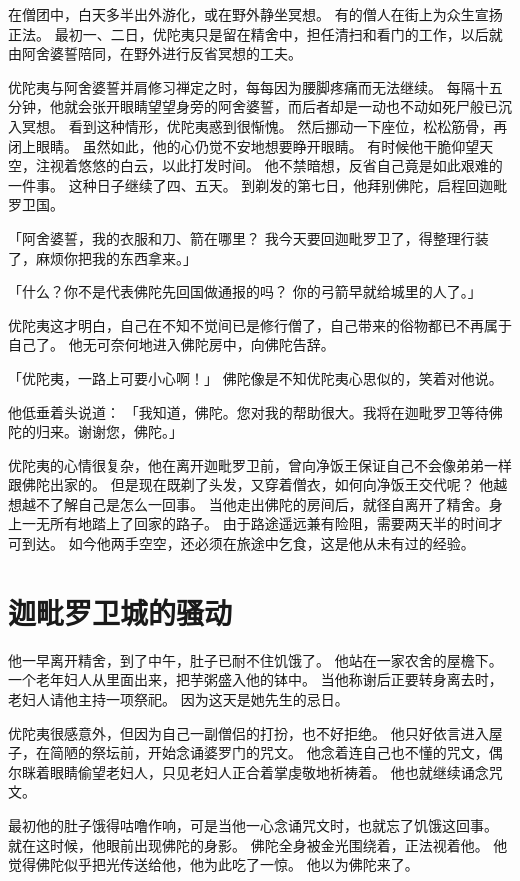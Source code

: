 \documentclass[twoside,openany]{book}
\begin{document}
在僧团中，白天多半出外游化，或在野外静坐冥想。
有的僧人在街上为众生宣扬正法。
最初一、二日，优陀夷只是留在精舍中，担任清扫和看门的工作，以后就由阿舍婆誓陪同，在野外进行反省冥想的工夫。

优陀夷与阿舍婆誓并肩修习禅定之时，每每因为腰脚疼痛而无法继续。
每隔十五分钟，他就会张开眼睛望望身旁的阿舍婆誓，而后者却是一动也不动如死尸般已沉入冥想。
看到这种情形，优陀夷惑到很惭愧。
然后挪动一下座位，松松筋骨，再闭上眼睛。
虽然如此，他的心仍觉不安地想要睁开眼睛。
有时候他干脆仰望天空，注视着悠悠的白云，以此打发时间。
他不禁暗想，反省自己竟是如此艰难的一件事。
这种日子继续了四、五天。
到剃发的第七日，他拜别佛陀，启程回迦毗罗卫国。

「阿舍婆誓，我的衣服和刀、箭在哪里？
我今天要回迦毗罗卫了，得整理行装了，麻烦你把我的东西拿来。」

「什么？你不是代表佛陀先回国做通报的吗？
你的弓箭早就给城里的人了。」

优陀夷这才明白，自己在不知不觉间已是修行僧了，自己带来的俗物都已不再属于自己了。
他无可奈何地进入佛陀房中，向佛陀告辞。

「优陀夷，一路上可要小心啊！」
佛陀像是不知优陀夷心思似的，笑着对他说。

他低垂着头说道：
「我知道，佛陀。您对我的帮助很大。我将在迦毗罗卫等待佛陀的归来。谢谢您，佛陀。」

优陀夷的心情很复杂，他在离开迦毗罗卫前，曾向净饭王保证自己不会像弟弟一样跟佛陀出家的。
但是现在既剃了头发，又穿着僧衣，如何向净饭王交代呢？
他越想越不了解自己是怎么一回事。
当他走出佛陀的房间后，就径自离开了精舍。身上一无所有地踏上了回家的路子。
由于路途遥远兼有险阻，需要两天半的时间才可到达。
如今他两手空空，还必须在旅途中乞食，这是他从未有过的经验。

\section{迦毗罗卫城的骚动}\label{sec7.5}
他一早离开精舍，到了中午，肚子已耐不住饥饿了。
他站在一家农舍的屋檐下。
一个老年妇人从里面出来，把芋粥盛入他的钵中。
当他称谢后正要转身离去时，老妇人请他主持一项祭祀。
因为这天是她先生的忌日。

优陀夷很感意外，但因为自己一副僧侣的打扮，也不好拒绝。
他只好依言进入屋子，在简陋的祭坛前，开始念诵婆罗门的咒文。
他念着连自己也不懂的咒文，偶尔眯着眼睛偷望老妇人，只见老妇人正合着掌虔敬地祈祷着。
他也就继续诵念咒文。

最初他的肚子饿得咕噜作响，可是当他一心念诵咒文时，也就忘了饥饿这回事。
就在这时候，他眼前出现佛陀的身影。
佛陀全身被金光围绕着，正法视着他。
他觉得佛陀似乎把光传送给他，他为此吃了一惊。
他以为佛陀来了。
\end{document}
